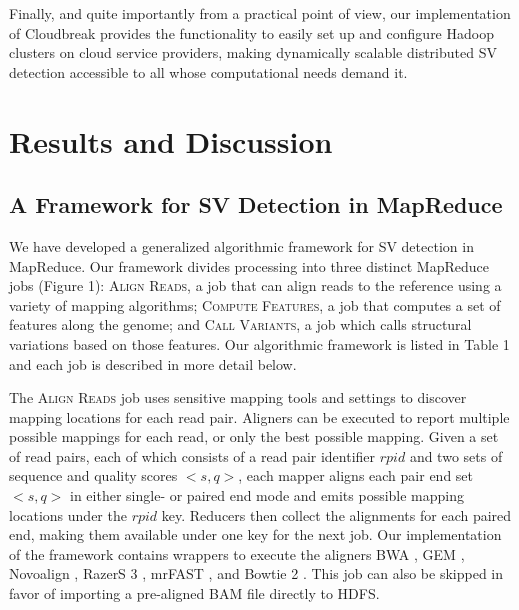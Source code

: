 \documentclass[10pt]{bmc_article}
\newenvironment{bmcformat}{\fussy\setboolean{publ}{true}}{\fussy}
\begin{document}
\begin{bmcformat}
Finally, and quite importantly from a practical point of view, our implementation of Cloudbreak provides the functionality to easily set up and configure Hadoop clusters on cloud service providers, making dynamically scalable distributed SV detection accessible to all whose computational needs demand it.
 
\section*{Results and Discussion}

\subsection*{A Framework for SV Detection in MapReduce}

We have developed a generalized algorithmic framework for SV detection in MapReduce. Our framework divides processing into three distinct MapReduce jobs (Figure 1): \textsc{Align Reads}, a job that can align reads to the reference using a variety of mapping algorithms; \textsc{Compute Features}, a job that computes a set of features along the genome; and \textsc{Call Variants}, a job which calls structural variations based on those features. Our algorithmic framework is listed in Table 1 and each job is described in more detail below.

The \textsc{Align Reads} job uses sensitive mapping tools and settings to discover mapping locations for each read pair. Aligners can be executed to report multiple possible mappings for each read, or only the best possible mapping. Given a set of read pairs, each of which consists of a read pair identifier $rpid$ and two sets of sequence and quality scores $<s,q>$, each mapper aligns each pair end set $<s,q>$ in either single- or paired end mode and emits possible mapping locations under the $rpid$ key. Reducers then collect the alignments for each paired end, making them available under one key for the next job. Our implementation of the framework contains wrappers to execute the aligners BWA \cite{Li:2009p836}, GEM \cite{MarcoSola:2012hm}, Novoalign \cite{novoalign}, RazerS 3 \cite{Weese:2012by}, mrFAST \cite{Alkan:2009cr}, and Bowtie 2 \cite{Langmead:2012jh}. This job can also be skipped in favor of importing a pre-aligned BAM file directly to HDFS.


\end{bmcformat}
\end{document}
